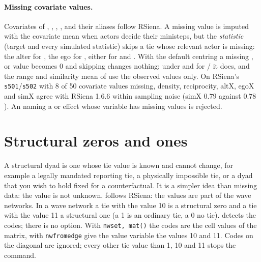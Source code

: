 \paragraph{Missing covariate values.} Covariates of , , , ,  and their aliases follow RSiena. A missing value is imputed with the covariate mean when actors decide their ministeps, but the \emph{statistic} (target and every simulated statistic) skips a tie whose relevant actor is missing: the alter for , the ego for , either for  and . With the default centring a missing ,  or  value becomes 0 and skipping changes nothing; under  and for / it does, and the range and similarity mean of  use the observed values only. On RSiena's \texttt{s501}/\texttt{s502} with 8 of 50 covariate values missing, density, reciprocity, altX, egoX and simX agree with RSiena 1.6.6 within sampling noise (simX $0.79$ against $0.78$). An  naming a  or  effect whose variable has missing values is rejected.

\section{Structural zeros and ones}\label{sec:structural}
A structural dyad is one whose tie value is known and cannot change, for example a legally mandated reporting tie, a physically impossible tie, or a dyad that you wish to hold fixed for a counterfactual. It is a simpler idea than missing data: the value is not unknown. \nwsaom{} follows RSiena: the values are part of the wave networks. In a wave network a tie with the value 10 is a structural zero and a tie with the value 11 a structural one (a 1 is an ordinary tie, a 0 no tie). \nwsaom{} detects the codes; there is no option. With \texttt{nwset, mat()} the codes are the cell values of the matrix, with \texttt{nwfromedge} give the value variable the values 10 and 11. Codes on the diagonal are ignored; every other tie value than 1, 10 and 11 stops the command.

